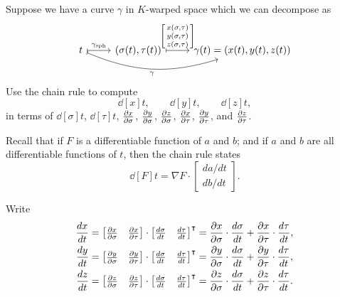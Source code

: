 \documentclass[newpage,hints,handout]{ximera}
\begin{document}
\begin{problem}
Suppose we have a curve $\gamma$ in $K$-warped space which we can decompose as
\[
\begin{tikzcd}
  t \ar[r,mapsto,"\gamma_{\mathrm{sph}}"] \ar[rr,mapsto,bend right=20,swap,"\gamma"] &  (\sigma(t),\tau(t))\ar[r,mapsto,"{\left[\begin{smallmatrix}
          x(\sigma,\tau)\\
          y(\sigma,\tau)\\
          z(\sigma,\tau)
        \end{smallmatrix}\right]}"
  ] & \gamma(t)=(x(t),y(t),z(t))
\end{tikzcd}
\]
Use the chain rule to compute
\[
\dd[x]{t},\qquad \dd[y]{t}, \qquad \dd[z]{t},
\]
in terms of $\dd[\sigma]{t}$, $\dd[\tau]{t}$, $\pp[x]{\sigma}$,
$\pp[y]{\sigma}$, $\pp[z]{\sigma}$, $\pp[x]{\tau}$, $\pp[y]{\tau}$,
and $\pp[z]{\tau}$.
\begin{hint}
  Recall that if $F$ is a differentiable function of $a$ and $b$; and if $a$ and
  $b$ are all differentiable functions of $t$, then the chain rule states
  \[
  \dd[F]{t} = \nabla F \cdot
  \begin{bmatrix}
    da/dt \\ db/dt
  \end{bmatrix}
  .
  \]
\end{hint}
\begin{freeResponse}
  Write
  \begin{align*}
    \dd[x]{t} &= \begin{bmatrix}\pp[x]{\sigma} & \pp[x]{\tau}\end{bmatrix}\cdot\begin{bmatrix}\dd[\sigma]{t} & \dd[\tau]{t}\end{bmatrix}^\transpose = \pp[x]{\sigma}\cdot\dd[\sigma]{t}+\pp[x]{\tau}\cdot\dd[\tau]{t}, \\
    \dd[y]{t} &= \begin{bmatrix}\pp[y]{\sigma} & \pp[y]{\tau}\end{bmatrix}\cdot\begin{bmatrix}\dd[\sigma]{t} & \dd[\tau]{t}\end{bmatrix}^\transpose = \pp[y]{\sigma}\cdot\dd[\sigma]{t}+\pp[y]{\tau}\cdot\dd[\tau]{t}, \\
    \dd[z]{t} &= \begin{bmatrix}\pp[z]{\sigma} & \pp[z]{\tau}\end{bmatrix}\cdot\begin{bmatrix}\dd[\sigma]{t} & \dd[\tau]{t}\end{bmatrix}^\transpose = \pp[z]{\sigma}\cdot\dd[\sigma]{t}+\pp[z]{\tau}\cdot\dd[\tau]{t}.  
  \end{align*}
\end{freeResponse}
\end{problem}
\end{document}
